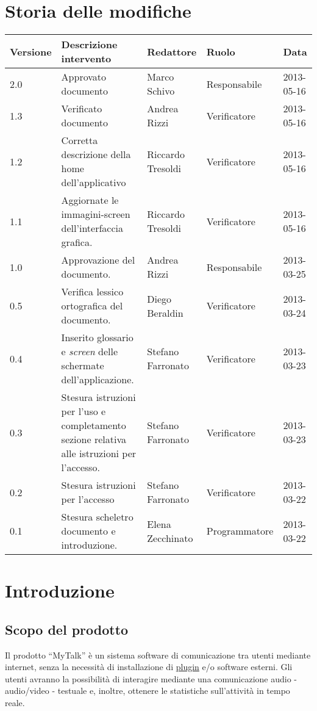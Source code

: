 \section*{Storia delle modifiche}
\begin{longtable}{lp{}lll}
\toprule
Versione & Descrizione intervento & Redattore & Ruolo & Data\\
\midrule %

2.0 & Approvato documento & Marco Schivo & Responsabile & 2013-05-16\\
1.3 & Verificato documento & Andrea Rizzi & Verificatore & 2013-05-16\\
1.2 & Corretta descrizione della home dell'applicativo & Riccardo Tresoldi & Verificatore & 2013-05-16\\
1.1 & Aggiornate le immagini-screen dell'interfaccia grafica. & Riccardo Tresoldi & Verificatore & 2013-05-16\\
1.0 & Approvazione del documento. & Andrea Rizzi & Responsabile & 2013-03-25\\
0.5 & Verifica lessico ortografica del documento. & Diego Beraldin & Verificatore & 2013-03-24\\
0.4 & Inserito glossario e \textit{screen} delle schermate dell'applicazione.& Stefano Farronato & Verificatore & 2013-03-23\\
0.3 & Stesura istruzioni per l'uso e completamento sezione relativa alle istruzioni per l'accesso. & Stefano Farronato & Verificatore & 2013-03-23\\
0.2 & Stesura istruzioni per l'accesso & Stefano Farronato & Verificatore & 2013-03-22\\
0.1 & Stesura scheletro documento e introduzione. & Elena Zecchinato & Programmatore & 2013-03-22\\
\bottomrule
\end{longtable}
\newpage




\setcounter{page}{1}
\pagestyle{normal}

\section{Introduzione}
\subsection{Scopo del prodotto}
Il prodotto ``MyTalk'' è un sistema software di comunicazione tra utenti mediante \underline{} internet, senza la necessità di installazione di \underline{plugin} e/o software esterni. Gli utenti avranno la possibilità di interagire mediante una comunicazione audio - audio/video - testuale e, inoltre, ottenere le statistiche sull'attività in tempo reale.

